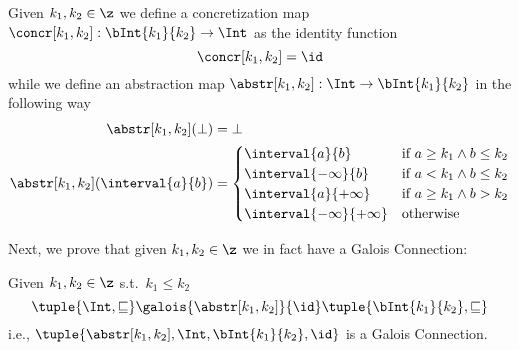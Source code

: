 \begin{definition}\label{def:abstrcons}
  Given \(k_1, k_2\in\z\) we define a concretization map
  \(\concr[k_1,k_2] : \bInt{k_1}{k_2} \to \Int\) as the
  identity function
  \begin{equation*}
    \concr[k_1,k_2] = \id
  \end{equation*}
  while we define an abstraction map
  \(\abstr[k_1, k_2] : \Int \to \bInt{k_1}{k_2}\) in the following way
  \begin{align*}
    \abstr[k_1,k_2](\bot) & = \bot \\
    \abstr[k_1,k_2](\interval{a}{b}) & =
                                       \begin{cases}
                                         \interval{a}{b} & \text{if } a \geq k_1 \wedge b \leq k_2 \\
                                         \interval{-\infty}{b} & \text{if } a < k_1 \wedge b \leq k_2 \\
                                         \interval{a}{+\infty} & \text{if } a \geq k_1 \wedge b > k_2 \\
                                         \interval{-\infty}{+\infty} & \text{otherwise}
                                       \end{cases}
  \end{align*}
\end{definition}

Next, we prove that given \(k_1, k_2\in\z\) we in fact have a Galois
Connection:

\begin{lemma}
  Given \(k_1, k_2 \in \z\) s.t.~\({k_1 \leq k_2}\)
  \begin{equation*}
    \tuple{\Int, \sqsubseteq} \galois{\abstr[k_1, k_2]}{\id} \tuple{\bInt{k_1}{k_2}, \sqsubseteq}
  \end{equation*}
  i.e., \(\tuple{\abstr[k_1, k_2], \Int, \bInt{k_1}{k_2}, \id}\) is
  a Galois Connection.
\end{lemma}

